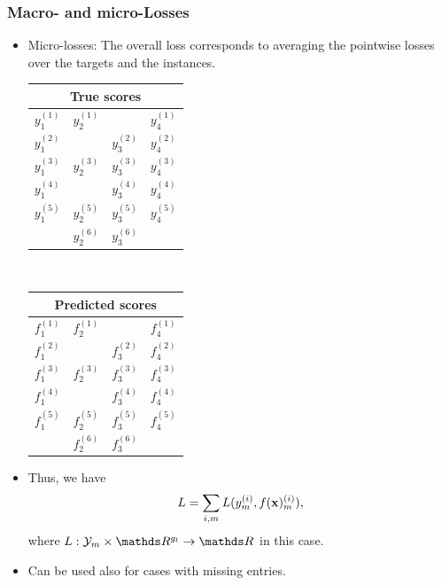 \documentclass[11pt,compress,t,notes=noshow, xcolor=table]{beamer}
\begin{document}
\begin{frame}
	\frametitle{Macro- and micro-Losses}
	
	\begin{itemize}
		\item<1-> Micro-losses: The overall loss corresponds to averaging the pointwise losses over the targets and the instances.
		
				\begin{center}
			\begin{tabular}{|c|c|c|c|}
				\multicolumn{4}{c}{True scores} \\
				\hline
				\color{putred}$y_1^{(1)}$ & \color{putred}$y_2^{(1)}$ & & \color{putred}$y_4^{(1)}$ \\
				\color{putred}$y_1^{(2)}$ & & \color{putred}$y_3^{(2)}$ & \color{putred}$y_4^{(2)}$ \\
				\color{putred}$y_1^{(3)}$ & \color{putred}$y_2^{(3)}$ & \color{putred}$y_3^{(3)}$ & \color{putred}$y_4^{(3)}$ \\
				\color{putred}$y_1^{(4)}$ &  & \color{putred}$y_3^{(4)}$ & \color{putred}$y_4^{(4)}$ \\
				\color{putred}$y_1^{(5)}$ & \color{putred}$y_2^{(5)}$ & \color{putred}$y_3^{(5)}$ & \color{putred}$y_4^{(5)}$ \\
				& \color{putred}$y_2^{(6)}$ & \color{putred}$y_3^{(6)}$ & \\
				\hline
			\end{tabular}
			$\quad$
			\begin{tabular}{|c|c|c|c|}
				\multicolumn{4}{c}{Predicted scores} \\
				\hline
				\color{putred}$f_1^{(1)}$ & \color{putred}$f_2^{(1)}$ &  & \color{putred}$f_4^{(1)}$ \\
				\color{putred}$f_1^{(2)}$ &  & \color{putred}$f_3^{(2)}$ & \color{putred}$f_4^{(2)}$ \\
				\color{putred}$f_1^{(3)}$ & \color{putred}$f_2^{(3)}$ & \color{putred}$f_3^{(3)}$ & \color{putred}$f_4^{(3)}$ \\
				\color{putred}$f_1^{(4)}$ & & \color{putred}$f_3^{(4)}$ & \color{putred}$f_4^{(4)}$ \\
				\color{putred}$f_1^{(5)}$ & \color{putred}$f_2^{(5)}$ & \color{putred}$f_3^{(5)}$ & \color{putred}$f_4^{(5)}$ \\
				& \color{putred}$f_2^{(6)}$ & \color{putred}$f_3^{(6)}$ & \\
				\hline
			\end{tabular}
		\end{center}
	\lz
	\item Thus, we have	
	$$
	L =  \sum_{i,m} L(y_m^{(i)} , f(\mathbf{x})_m^{(i)}),
	$$
	where $L: \Yspace_m \times \R^{g_l} \to \R$ in this case.
%	
	\item 	
		Can be used also for cases with missing entries.
	\end{itemize}
 

	
\end{frame}
\end{document}
